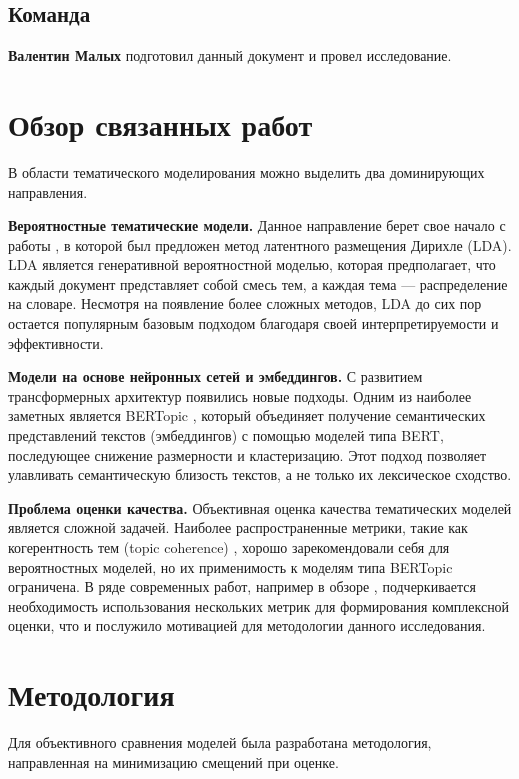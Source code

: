 \documentclass{article}
\begin{document}
\subsection{Команда}
\textbf{Валентин Малых} подготовил данный документ и провел исследование.



\section{Обзор связанных работ}
\label{sec:related}
В области тематического моделирования можно выделить два доминирующих направления.

\textbf{Вероятностные тематические модели.} Данное направление берет свое начало с работы \cite{blei2003latent}, в которой был предложен метод латентного размещения Дирихле (LDA). LDA является генеративной вероятностной моделью, которая предполагает, что каждый документ представляет собой смесь тем, а каждая тема — распределение на словаре. Несмотря на появление более сложных методов, LDA до сих пор остается популярным базовым подходом благодаря своей интерпретируемости и эффективности.

\textbf{Модели на основе нейронных сетей и эмбеддингов.} С развитием трансформерных архитектур появились новые подходы. Одним из наиболее заметных является BERTopic \cite{grootendorst2022bertopic}, который объединяет получение семантических представлений текстов (эмбеддингов) с помощью моделей типа BERT, последующее снижение размерности и кластеризацию. Этот подход позволяет улавливать семантическую близость текстов, а не только их лексическое сходство.

\textbf{Проблема оценки качества.} Объективная оценка качества тематических моделей является сложной задачей. Наиболее распространенные метрики, такие как когерентность тем (topic coherence) \cite{roder2015exploring}, хорошо зарекомендовали себя для вероятностных моделей, но их применимость к моделям типа BERTopic ограничена. В ряде современных работ, например в обзоре \cite{egger2022evaluating}, подчеркивается необходимость использования нескольких метрик для формирования комплексной оценки, что и послужило мотивацией для методологии данного исследования.

\section{Методология}
\label{sec:methodology}
Для объективного сравнения моделей была разработана методология, направленная на минимизацию смещений при оценке.
\end{document}
